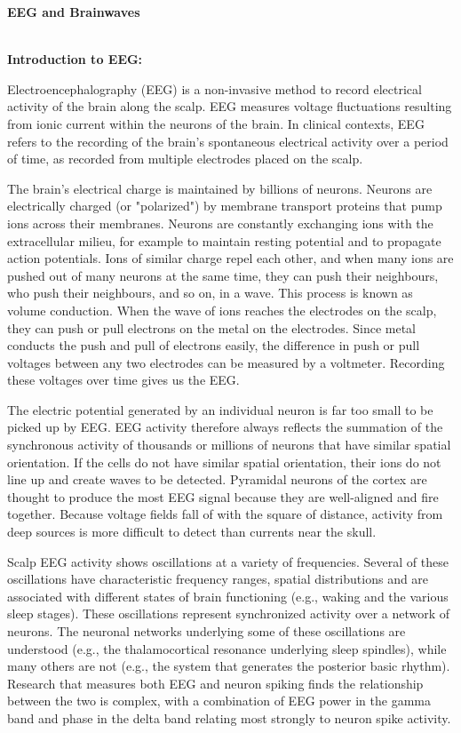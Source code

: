 \documentclass[10pt]{article}
\author{Raju}
\title{}
\begin{document}
\begin{center}
\textbf{{\huge EEG and Brainwaves}}
\end{center}


	 \textbf{{\Large \\Introduction to EEG:}}


{\large Electroencephalography (EEG) is a non-invasive method to record electrical activity of the brain along the scalp. EEG measures voltage fluctuations resulting from ionic current within the neurons of the brain. In clinical contexts, EEG refers to the recording of the brain's spontaneous electrical activity over a period of time, as recorded from multiple electrodes placed on the scalp.}

{\large The brain's electrical charge is maintained by billions of neurons. Neurons are electrically charged (or "polarized") by membrane transport proteins that pump ions across their membranes. Neurons are constantly exchanging ions with the extracellular milieu, for example to maintain resting potential and to propagate action potentials. Ions of similar charge repel each other, and when many ions are pushed out of many neurons at the same time, they can push their neighbours, who push their neighbours, and so on, in a wave. This process is known as volume conduction. When the wave of ions reaches the electrodes on the scalp, they can push or pull electrons on the metal on the electrodes. Since metal conducts the push and pull of electrons easily, the difference in push or pull voltages between any two electrodes can be measured by a voltmeter. Recording these voltages over time gives us the EEG.}

{\large The electric potential generated by an individual neuron is far too small to be picked up by EEG. EEG activity therefore always reflects the summation of the synchronous activity of thousands or millions of neurons that have similar spatial orientation. If the cells do not have similar spatial orientation, their ions do not line up and create waves to be detected. Pyramidal neurons of the cortex are thought to produce the most EEG signal because they are well-aligned and fire together. Because voltage fields fall of with the square of distance, activity from deep sources is more difficult to detect than currents near the skull.}

{\large Scalp EEG activity shows oscillations at a variety of frequencies. Several of these oscillations have characteristic frequency ranges, spatial distributions and are associated with different states of brain functioning (e.g., waking and the various sleep stages). These oscillations represent synchronized activity over a network of neurons. The neuronal networks underlying some of these oscillations are understood (e.g., the thalamocortical resonance underlying sleep spindles), while many others are not (e.g., the system that generates the posterior basic rhythm). Research that measures both EEG and neuron spiking finds the relationship between the two is complex, with a combination of EEG power in the gamma band and phase in the delta band relating most strongly to neuron spike activity.
	
	}
\end{document}
